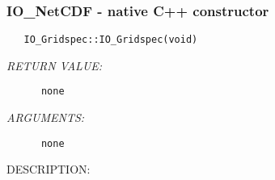  
\setlength{\oldparskip}{\parskip}
\setlength{\parskip}{1.5ex}
\setlength{\oldparindent}{\parindent}
\setlength{\parindent}{0pt}
\setlength{\oldbaselineskip}{\baselineskip}
\setlength{\baselineskip}{11pt}
 
\def\bv{\begin{verbatim}}
\def\ev{\end{verbatim}}
\def\be{\begin{equation}}
\def\ee{\end{equation}}
\def\bea{\begin{eqnarray}}
\def\eea{\end{eqnarray}}
\def\bi{\begin{itemize}}
\def\ei{\end{itemize}}
\def\bn{\begin{enumerate}}
\def\en{\end{enumerate}}
\def\bd{\begin{description}}
\def\ed{\end{description}}
\def\({\left (}
\def\){\right )}
\def\[{\left [}
\def\]{\right ]}
\def\<{\left  \langle}
\def\>{\right \rangle}
\def\cI{{\cal I}}
\def\diag{\mathop{\rm diag}}
\def\tr{\mathop{\rm tr}}


 
\subsubsection [IO\_NetCDF] {IO\_NetCDF - native C++ constructor}


  
\begin{verbatim}   IO_Gridspec::IO_Gridspec(void)\end{verbatim}{\em RETURN VALUE:}
\begin{verbatim}      none\end{verbatim}{\em ARGUMENTS:}
\begin{verbatim}      none\end{verbatim}
{\sf DESCRIPTION:\\ }


